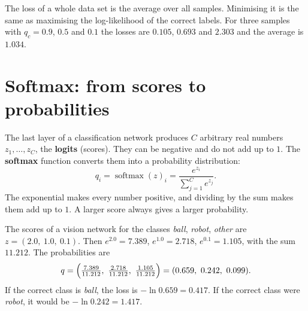 \begin{center}
\label{fig:pr6_xent}
\end{center}

The loss of a whole data set is the average over all samples. Minimising it is the same as maximising the log-likelihood of the correct labels. For three samples with $q_c=0.9$, $0.5$ and $0.1$ the losses are $0.105$, $0.693$ and $2.303$ and the average is $1.034$.

\section*{Softmax: from scores to probabilities}
The last layer of a classification network produces $C$ arbitrary real numbers $z_1,\dots,z_C$, the \textbf{logits} (scores). They can be negative and do not add up to $1$. The \textbf{softmax} function converts them into a probability distribution:
\[
q_i=\operatorname{softmax}(z)_i=\frac{e^{z_i}}{\sum_{j=1}^Ce^{z_j}}.
\]
The exponential makes every number positive, and dividing by the sum makes them add up to $1$. A larger score always gives a larger probability.

\begin{example}
The scores of a vision network for the classes \emph{ball}, \emph{robot}, \emph{other} are $z=(2.0,\ 1.0,\ 0.1)$. Then $e^{2.0}=7.389$, $e^{1.0}=2.718$, $e^{0.1}=1.105$, with the sum $11.212$. The probabilities are
\[
q=\Bigl(\tfrac{7.389}{11.212},\ \tfrac{2.718}{11.212},\ \tfrac{1.105}{11.212}\Bigr)=(0.659,\ 0.242,\ 0.099).
\]
If the correct class is \emph{ball}, the loss is $-\ln0.659=0.417$. If the correct class were \emph{robot}, it would be $-\ln0.242=1.417$.
\end{example}

